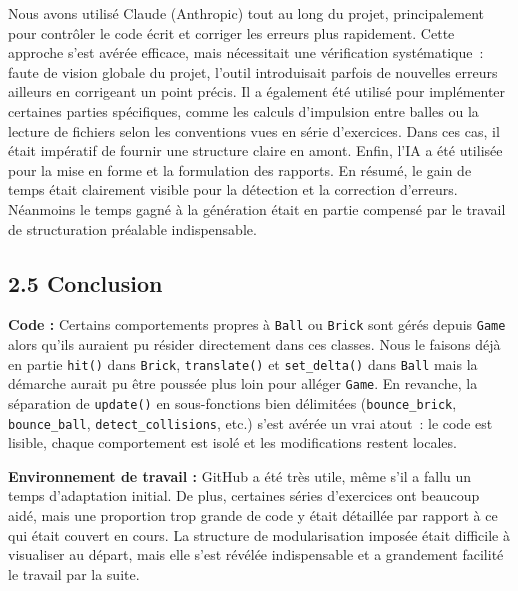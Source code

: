 \documentclass[10pt,a4paper]{article}
\begin{document}
Nous avons utilisé Claude (Anthropic) tout au long du projet, principalement pour contrôler
le code écrit et corriger les erreurs plus rapidement. Cette approche s'est avérée efficace,
mais nécessitait une vérification systématique~: faute de vision globale du projet, l'outil
introduisait parfois de nouvelles erreurs ailleurs en corrigeant un point précis. Il a
également été utilisé pour implémenter certaines parties spécifiques, comme les calculs
d'impulsion entre balles ou la lecture de fichiers selon les conventions vues en série
d'exercices. Dans ces cas, il était impératif de fournir une structure claire en amont. Enfin, l'IA a été
utilisée pour la mise en forme et la formulation des rapports. En résumé, le gain de temps était clairement visible pour la détection et la correction
d'erreurs. Néanmoins le temps gagné à la
génération était en partie compensé par le travail de structuration préalable
indispensable.

\subsection*{2.5 Conclusion}

\textbf{Code :} Certains comportements propres à \texttt{Ball} ou \texttt{Brick} sont
gérés depuis \texttt{Game} alors qu'ils auraient pu résider directement dans ces classes.
Nous le faisons déjà en partie \texttt{hit()} dans \texttt{Brick}, \texttt{translate()}
et \texttt{set\_delta()} dans \texttt{Ball} mais la démarche aurait pu être poussée plus
loin pour alléger \texttt{Game}. En revanche, la séparation de \texttt{update()} en
sous-fonctions bien délimitées (\texttt{bounce\_brick}, \texttt{bounce\_ball},
\texttt{detect\_collisions}, etc.) s'est avérée un vrai atout~: le code est lisible,
chaque comportement est isolé et les modifications restent locales.

\textbf{Environnement de travail :} GitHub a été très utile, même s'il a fallu un temps
d'adaptation initial. De plus, certaines séries d'exercices ont beaucoup aidé, mais une proportion
trop grande de code y était détaillée par rapport à ce qui était couvert en cours. La
structure de modularisation imposée était difficile à visualiser au départ, mais elle s'est
révélée indispensable et a grandement facilité le travail par la suite.

\end{document}
